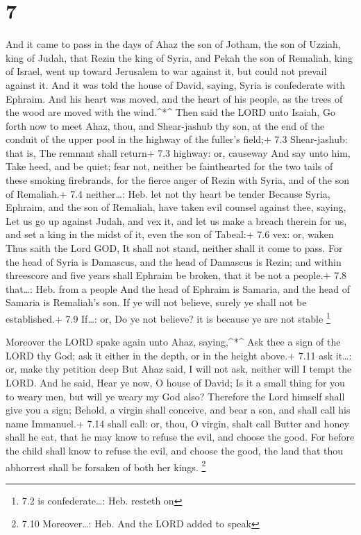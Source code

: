 \hypertarget{section-6}{%
\section{7}\label{section-6}}

 And it came to pass in the days of Ahaz the son of Jotham,
the son of Uzziah, king of Judah, that Rezin the king of Syria, and
Pekah the son of Remaliah, king of Israel, went up toward Jerusalem to
war against it, but could not prevail against it.  And it
was told the house of David, saying, Syria is confederate with Ephraim.
And his heart was moved, and the heart of his people, as the trees of
the wood are moved with the wind.\^{}*\^{}  Then said the
LORD unto Isaiah, Go forth now to meet Ahaz, thou, and Shear-jashub thy
son, at the end of the conduit of the upper pool in the highway of the
fuller's field;+ 7.3 Shear-jashub: that is, The remnant shall return+
7.3 highway: or, causeway  And say unto him, Take heed, and
be quiet; fear not, neither be fainthearted for the two tails of these
smoking firebrands, for the fierce anger of Rezin with Syria, and of the
son of Remaliah.+ 7.4 neither\ldots: Heb. let not thy heart be tender
 Because Syria, Ephraim, and the son of Remaliah, have taken
evil counsel against thee, saying,  Let us go up against
Judah, and vex it, and let us make a breach therein for us, and set a
king in the midst of it, even the son of Tabeal:+ 7.6 vex: or, waken
 Thus saith the Lord GOD, It shall not stand, neither shall
it come to pass.  For the head of Syria is Damascus, and the
head of Damascus is Rezin; and within threescore and five years shall
Ephraim be broken, that it be not a people.+ 7.8 that\ldots: Heb. from a
people  And the head of Ephraim is Samaria, and the head of
Samaria is Remaliah's son. If ye will not believe, surely ye shall not
be established.+ 7.9 If\ldots: or, Do ye not believe? it is because ye
are not stable \footnote{7.2 is confederate\ldots: Heb. resteth on}

 Moreover the LORD spake again unto Ahaz, saying,\^{}*\^{}
 Ask thee a sign of the LORD thy God; ask it either in the
depth, or in the height above.+ 7.11 ask it\ldots: or, make thy petition
deep  But Ahaz said, I will not ask, neither will I tempt
the LORD.  And he said, Hear ye now, O house of David; Is
it a small thing for you to weary men, but will ye weary my God also?
 Therefore the Lord himself shall give you a sign; Behold,
a virgin shall conceive, and bear a son, and shall call his name
Immanuel.+ 7.14 shall call: or, thou, O virgin, shalt call 
Butter and honey shall he eat, that he may know to refuse the evil, and
choose the good.  For before the child shall know to refuse
the evil, and choose the good, the land that thou abhorrest shall be
forsaken of both her kings. \footnote{7.10 Moreover\ldots: Heb. And the
  LORD added to speak}

